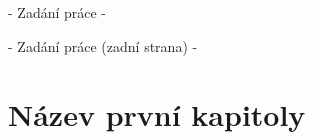 


\def\documentdate{7. července 2017}

\pagestyle{empty}



\cleardoublepage

\null\vfill
\begin{center}
	- Zadání práce -
\par\end{center}
\vfill

\newpage

\null\vfill
\begin{center}
	- Zadání práce (zadní strana) -
\par\end{center}
\vfill

\cleardoublepage



\cleardoublepage



\cleardoublepage

\pagestyle{plain}

\tableofcontents



\pagestyle{headings}

\chapter{Název první kapitoly}

\pagestyle{plain}



\nocite{*}
\printbibliography[title=Literatura]


